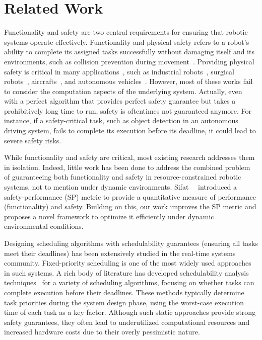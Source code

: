 	\section{Related Work}
    
	Functionality and safety are two central requirements for ensuring that robotic systems operate effectively. Functionality and physical safety refers to a robot's ability to complete its assigned tasks successfully without damaging itself and its environments, such as collision prevention during movement~\cite{PARIGIPOLVERINI201725, safety20, Vicentini19TRO_Safety, Terra20ICCAR}. 
    Providing physical safety is critical in many applications~\cite{Vasic2013SafetyII,Ames2016ControlBF, Fisac2017AGS, Xiong2022MultiLayeredSC, Singletary2020SafetyCriticalKC}, such as industrial robots~\cite{Bi2021SafetyAM, RodrguezGuerra2021HumanRobotIR}, surgical robots~\cite{Haidegger2022RobotAssistedMI}, aircrafts~\cite{Zipay2016TheUF, Molnr2021ModelFreeSC}, 
    and autonomous vehicles~\cite{Zheng2023LearningBasedSC, Wang2023PosterEA}. 
    However, most of these works fail to consider the computation aspects of the underlying system. 
    Actually, even with a perfect algorithm that provides perfect safety guarantee but takes a prohibitively long time to run, safety is oftentimes not guaranteed anymore.
    For instance, if a safety-critical task, such as object detection in an autonomous driving system, fails to complete its execution before its deadline, it could lead to severe safety risks.

    While functionality and safety are critical, most existing research addresses them in isolation.  Indeed, little work has been done to address the combined problem of guaranteeing both functionality and safety in resource-constrained robotic systems, not to mention under dynamic environments. Sifat~\etal~\cite{Ash23RAL} introduced a safety-performance (SP) metric to provide a quantitative measure of performance (functionality) and safety. Building on this, our work improves the SP metric and proposes a novel framework to optimize it efficiently under dynamic environmental conditions.
    
    
	Designing scheduling algorithms with schedulability guarantees (\ie ensuring all tasks meet their deadlines) has been extensively studied in the real-time systems community. Fixed-priority scheduling is one of the most widely used approaches in such systems. A rich body of literature has developed schedulability analysis techniques~\cite{Liu1973SchedulingAF, Zhao2017AnES, Maxim2013ResponseTA, Maxim2022ProbabilisticA, zhao2017virtual, Ueter2021ResponseTimeAA, Gnzel2021SuspensionAwareFS} for a variety of scheduling algorithms, focusing on whether tasks can complete execution before their deadlines. These methods typically determine task priorities during the system design phase, using the worst-case execution time of each task as a key factor. Although such static approaches provide strong safety guarantees, they often lead to underutilized computational resources and increased hardware costs due to their overly pessimistic nature.


